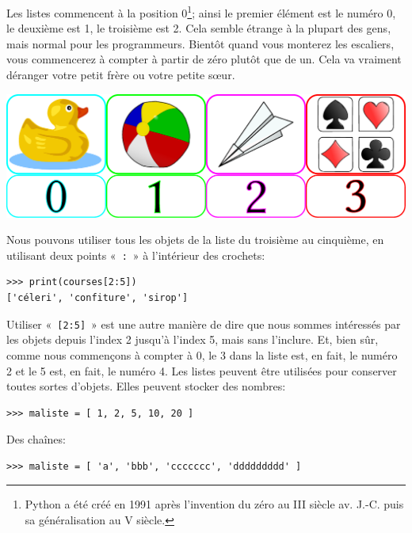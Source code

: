 Les listes commencent à la position 0\footnote{Python a été créé en 1991 après l'invention du zéro au III siècle av. J.-C. puis sa généralisation au V siècle.}; ainsi le premier élément est le numéro 0, le deuxième est 1, le troisième est 2. Cela semble étrange à la plupart des gens, mais normal pour les programmeurs. Bientôt quand vous monterez les escaliers, vous commencerez à compter à partir de zéro plutôt que de un. Cela va vraiment déranger votre petit frère ou votre petite sœur.\\

\begin{center}
\includegraphics[scale=0.7]{images/liste.pdf} 

\end{center}
Nous pouvons utiliser tous les objets de la liste du troisième au cinquième, en utilisant deux points «~\verb+:+~» à l'intérieur des crochets:

\begin{Verbatim}[frame=single,rulecolor=\color{mbleu}, label=à taper]
>>> print(courses[2:5])
['céleri', 'confiture', 'sirop']
\end{Verbatim}

Utiliser «~\verb+[2:5]+~» est une autre manière de dire que nous sommes intéressés par les objets depuis l'index 2 jusqu'à l'index 5, mais sans l'inclure. Et, bien sûr, comme nous commençons à compter à 0, le 3 dans la liste est, en fait, le numéro 2 et le 5 est, en fait, le numéro 4. Les listes peuvent être utilisées pour conserver toutes sortes d'objets. Elles peuvent stocker des nombres:\\


\begin{Verbatim}[frame=single,rulecolor=\color{mbleu}, label=à taper]
>>> maliste = [ 1, 2, 5, 10, 20 ]
\end{Verbatim}

Des chaînes:

\begin{Verbatim}[frame=single,rulecolor=\color{mbleu}, label=à taper]
>>> maliste = [ 'a', 'bbb', 'ccccccc', 'ddddddddd' ]
\end{Verbatim}

